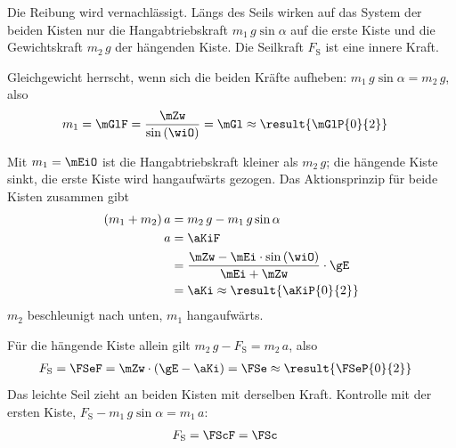 \begin{center}
\end{center}

Die Reibung wird vernachlässigt. Längs des Seils wirken auf das System der beiden Kisten nur die Hangabtriebskraft $m_1\,g\sin\alpha$ auf die erste Kiste und die Gewichtskraft $m_2\,g$ der hängenden Kiste. Die Seilkraft $F_\mathrm{S}$ ist eine innere Kraft.
\begin{abcliste}
\abc Gleichgewicht herrscht, wenn sich die beiden Kräfte aufheben: $m_1\,g\sin\alpha = m_2\,g$, also
\begin{align}
 m_1 &= \mGlF = \frac{\mZw}{\sin\left(\wiO\right)} = \mGl \approx \result{\mGlP{0}{2}}
\end{align}

\abc Mit $m_1 = \mEiO$ ist die Hangabtriebskraft kleiner als $m_2\,g$; die hängende Kiste sinkt, die erste Kiste wird hangaufwärts gezogen. Das Aktionsprinzip für beide Kisten zusammen gibt
\begin{align}
 \left(m_1+m_2\right)a &= m_2\,g - m_1\,g\sin\alpha \\
 a &= \aKiF \\
   &= \frac{\mZw-\mEi\cdot\sin\left(\wiO\right)}{\mEi+\mZw}\cdot\gE \\
   &= \aKi \approx \result{\aKiP{0}{2}}
\end{align}
$m_2$ beschleunigt nach unten, $m_1$ hangaufwärts.

\abc Für die hängende Kiste allein gilt $m_2\,g - F_\mathrm{S} = m_2\,a$, also
\begin{align}
 F_\mathrm{S} &= \FSeF = \mZw\cdot\left(\gE-\aKi\right) = \FSe \approx \result{\FSeP{0}{2}}
\end{align}
Das leichte Seil zieht an beiden Kisten mit derselben Kraft. Kontrolle mit der ersten Kiste, $F_\mathrm{S} - m_1\,g\sin\alpha = m_1\,a$:
\begin{align}
 F_\mathrm{S} &= \FScF = \FSc
\end{align}
\end{abcliste}
